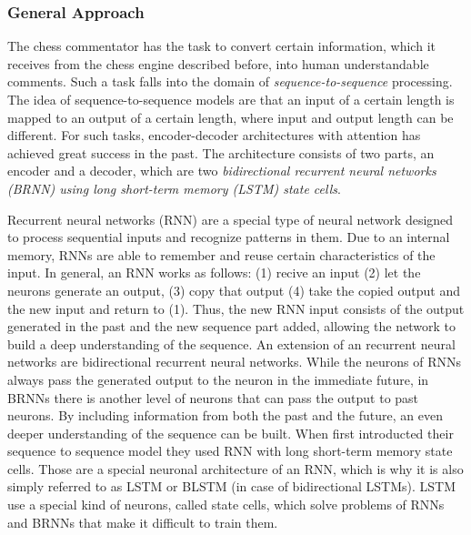 \subsubsection{General Approach}

The chess commentator has the task to convert certain information, which it receives from the chess engine described before, into human understandable comments. Such a task falls into the domain of \textit{sequence-to-sequence} processing. The idea of sequence-to-sequence models are that an input of a certain length is mapped to an output of a certain length, where input and output length can be different. For such tasks, encoder-decoder architectures with attention has achieved great success in the past. The architecture consists of two parts, an encoder and a decoder, which are two \textit{bidirectional recurrent neural networks (BRNN) using long short-term memory (LSTM) state cells}.

Recurrent neural networks (RNN) are a special type of neural network designed to process sequential inputs and recognize patterns in them. Due to an internal memory, RNNs are able to remember and reuse certain characteristics of the input. In general, an RNN works as follows: (1) recive an input (2) let the neurons generate an output, (3) copy that output (4) take the copied output and the new input and return to (1). Thus, the new RNN input consists of the output generated in the past and the new sequence part added, allowing the network to build a deep understanding of the sequence. An extension of an recurrent neural networks are bidirectional recurrent neural networks. While the neurons of RNNs always pass the generated output to the neuron in the immediate future, in BRNNs there is another level of neurons that can pass the output to past neurons. By including information from both the past and the future, an even deeper understanding of the sequence can be built. When \citep{Sutskever-2014-sts} first introducted their sequence to sequence model they used RNN with long short-term memory state cells. Those are a special neuronal architecture of an RNN, which is why it is also simply referred to as LSTM or BLSTM (in case of bidirectional LSTMs). LSTM use a special kind of neurons, called state cells, which solve problems of RNNs and BRNNs that make it difficult to train them.

